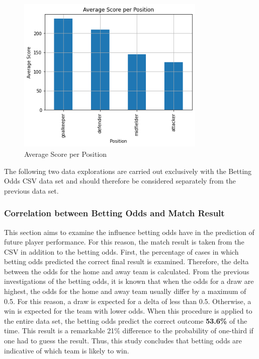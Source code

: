 \begin{figure}[H]
    \centering
    \includegraphics[width=9cm]{chapter/4_implementation/section/2_data/section/figures/average_score_per_position.png}
    \captionsetup{justification=centering}
    \caption{Average Score per Position}
    \label{fig:average_score_per_position}
\end{figure}

The following two data explorations are carried out exclusively with the Betting Odds CSV data set \parencite[][]{football-data_germany_nodate} and should therefore be considered separately from the previous data set.

\subsubsection{Correlation between Betting Odds and Match Result}

This section aims to examine the influence betting odds have in the prediction of future player performance. For this reason, the match result is taken from the CSV in addition to the betting odds. First, the percentage of cases in which betting odds predicted the correct final result is examined. Therefore, the delta between the odds for the home and away team is calculated. From the previous investigations of the betting odds, it is known that when the odds for a draw are highest, the odds for the home and away team usually differ by a maximum of 0.5. For this reason, a draw is expected for a delta of less than 0.5. Otherwise, a win is expected for the team with lower odds. When this procedure is applied to the entire data set, the betting odds predict the correct outcome \textbf{53.6\%} of the time. This result is a remarkable 21\% difference to the probability of one-third if one had to guess the result. Thus, this study concludes that betting odds are indicative of which team is likely to win. 

